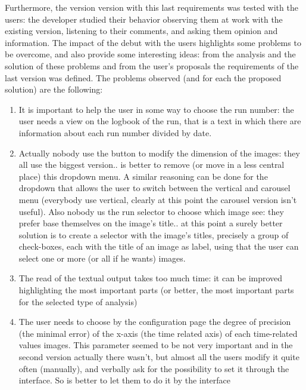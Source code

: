 Furthermore, the version version with this last requirements was tested with the users: the developer studied their behavior observing them at work with the existing version, listening to their comments, and asking them opinion and information. The impact of the debut with the users highlights some problems to be overcome, and also provide some interesting ideas: from the analysis and the solution of these problems and from the user's proposals the requirements of the last version was defined. The problems observed (and for each the proposed solution) are the following:

\begin{enumerate}
\item 
It is important to help the user in some way to choose the run number: the user needs a view on the logbook of the run, that is a text in which there are information about each run number divided by date.

\item
Actually nobody use the button to modify the dimension of the images: they all use the biggest version.. is better to remove (or move in a less central place) this dropdown menu. A similar reasoning can be done for the dropdown that allows the user to switch between the vertical and carousel menu (everybody use vertical, clearly at this point the carousel version isn't useful). Also nobody us the run selector to choose which image see: they prefer base themselves on the image's title.. at this point a surely better solution is to create a selector with the image's titles, precisely a group of check-boxes, each with the title of an image as label, using that the user can select one or more (or all if he wants) images.  

\item
The read of the textual output takes too much time: it can be improved highlighting the most important parts (or better, the most important parts for the selected type of analysis)

\item
The user needs to choose by the configuration page the degree of precision (the minimal error) of the x-axis (the time related axis) of each time-related values images. This parameter seemed to be not very important and in the second version actually there wasn't, but almost all the users modify it quite often (manually), and verbally ask for the possibility to set it through the interface. So is better to let them to do it by the interface

\end{enumerate}

